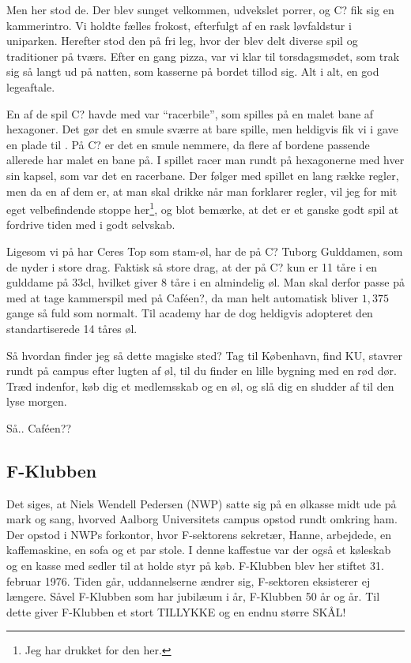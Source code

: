 Men her stod de. Der blev sunget velkommen, udvekslet porrer, og C? fik sig en kammerintro. Vi holdte fælles frokost, efterfulgt af en rask løvfaldstur i uniparken. Herefter stod den på fri leg, hvor der blev delt diverse spil og traditioner på tværs. Efter en gang pizza, var vi klar til torsdagsmødet, som trak sig så langt ud på natten, som kasserne på bordet tillod sig. Alt i alt, en god legeaftale.

En af de spil C? havde med var ``racerbile'', som spilles på en malet bane af hexagoner. Det gør det en smule sværre at bare spille, men heldigvis fik vi i gave en plade til \TKET. På C? er det en smule nemmere, da flere af bordene passende allerede har malet en bane på.
I spillet racer man rundt på hexagonerne med hver sin kapsel, som var det en racerbane. Der følger med spillet en lang række regler, men da en af dem er, at man skal drikke når man forklarer regler, vil jeg for mit eget velbefindende stoppe her\footnote{Jeg har drukket for den her.}, og blot bemærke, at det er et ganske godt spil at fordrive tiden med i godt selvskab.

Ligesom vi på \TKET har Ceres Top som stam-øl, har de på C? Tuborg Gulddamen, som de nyder i store drag.
Faktisk så store drag, at der på C? kun er 11 tåre i en gulddame på 33cl, hvilket giver 8 tåre i en almindelig øl. Man skal derfor passe på med at tage kammerspil med på Caféen?, da man helt automatisk bliver $1,375$ gange så fuld som normalt. Til academy har de dog heldigvis adopteret den standartiserede 14 tåres øl.

Så hvordan finder jeg så dette magiske sted? Tag til København, find KU, stavrer rundt på campus efter lugten af øl, til du finder en lille bygning med en rød dør. Træd indenfor, køb dig et medlemsskab og en øl, og slå dig en sludder af til den lyse morgen.

Så.. Caféen??

\vfill
{}
\vfill

\newpage

\subsection{F-Klubben}
Det siges, at Niels Wendell Pedersen (NWP) satte sig på en ølkasse midt ude på mark og sang, hvorved Aalborg Universitets campus opstod rundt omkring ham.
Der opstod i NWPs forkontor, hvor F-sektorens sekretær, Hanne, arbejdede, en kaffemaskine, en sofa og et par stole. I denne kaffestue var der også et køleskab og en kasse med sedler til at holde styr på køb. F-Klubben blev her stiftet 31. februar 1976. 
Tiden går, uddannelserne ændrer sig, F-sektoren eksisterer ej længere. Såvel F-Klubben som \TKET har jubilæum i år, F-Klubben 50 år og  år. Til dette giver F-Klubben et stort TILLYKKE og en endnu større SKÅL!

